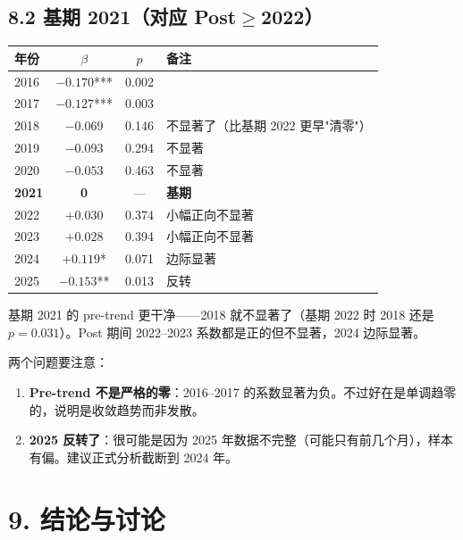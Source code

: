 \documentclass[12pt,a4paper]{article}
\begin{document}
\subsection*{8.2 基期 2021（对应 Post$\geq$2022）}

\begin{center}
\small
\begin{tabular}{lccl}
\toprule
年份 & $\beta$ & $p$ & 备注 \\
\midrule
2016 & $-0.170$*** & 0.002 & \\
2017 & $-0.127$*** & 0.003 & \\
2018 & $-0.069$ & 0.146 & 不显著了（比基期 2022 更早"清零"）\\
2019 & $-0.093$ & 0.294 & 不显著 \\
2020 & $-0.053$ & 0.463 & 不显著 \\
\textbf{2021} & \textbf{0} & --- & \textbf{基期} \\
2022 & $+0.030$ & 0.374 & 小幅正向不显著 \\
2023 & $+0.028$ & 0.394 & 小幅正向不显著 \\
2024 & $+0.119$* & 0.071 & 边际显著 \\
2025 & $-0.153$** & 0.013 & 反转 \\
\bottomrule
\end{tabular}
\end{center}

基期 2021 的 pre-trend 更干净——2018 就不显著了（基期 2022 时 2018 还是 $p=0.031$）。Post 期间 2022--2023 系数都是正的但不显著，2024 边际显著。

两个问题要注意：
\begin{enumerate}
  \item \textbf{Pre-trend 不是严格的零}：2016--2017 的系数显著为负。不过好在是单调趋零的，说明是收敛趋势而非发散。
  \item \textbf{2025 反转了}：很可能是因为 2025 年数据不完整（可能只有前几个月），样本有偏。建议正式分析截断到 2024 年。
\end{enumerate}

\bigskip

\section*{9. 结论与讨论}
\end{document}

